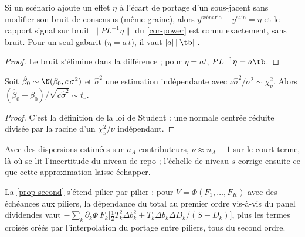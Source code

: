 \begin{lemma}
Si un scénario ajoute un effet $\eta$ à l'écart de portage d'un sous-jacent sans modifier son bruit de consensus (même
graine), alors $y^{\text{scénario}}-y^{\text{sain}}=\eta$ et le rapport signal sur bruit $\|PL^{-1}\eta\|$ du
\cref{cor-power} est connu exactement, sans bruit. Pour un seul gabarit ($\eta=a\,t$), il vaut $|a|\,\|\tb\|$.
\end{lemma}
\begin{proof}
Le bruit s'élimine dans la différence ; pour $\eta=at$, $PL^{-1}\eta=a\tb$.
\end{proof}

\begin{lemma}
Soit $\hat\beta_0\sim\N(\beta_0,c\,\sigma^2)$ et $\hat\sigma^2$ une estimation indépendante avec
$\nu\hat\sigma^2/\sigma^2\sim\chi^2_\nu$. Alors $(\hat\beta_0-\beta_0)/\sqrt{c\hat\sigma^2}\sim t_\nu$.
\end{lemma}
\begin{proof}
C'est la définition de la loi de Student : une normale centrée réduite divisée par la racine d'un $\chi^2_\nu/\nu$
indépendant.
\end{proof}
Avec des dispersions estimées sur $n_A$ contributeurs, $\nu\approx n_A-1$ sur le court terme, là où se lit l'incertitude
du niveau de repo ; l'échelle de niveau $s$ corrige ensuite ce que cette approximation laisse échapper.

\begin{remark}
La \cref{prop-second} s'étend pilier par pilier : pour $V=\Phi(F_1,\dots,F_K)$ avec des échéances aux piliers, la dépendance
du total au premier ordre vis-à-vis du panel dividendes vaut
$-\sum_k\partial_k\Phi\,F_k\bigl[\tfrac12T_k^2\Delta b_k^2+T_k\Delta b_k\Delta D_k/(S-D_k)\bigr]$, plus les termes croisés créés
par l'interpolation du portage entre piliers, tous du second ordre.
\end{remark}

